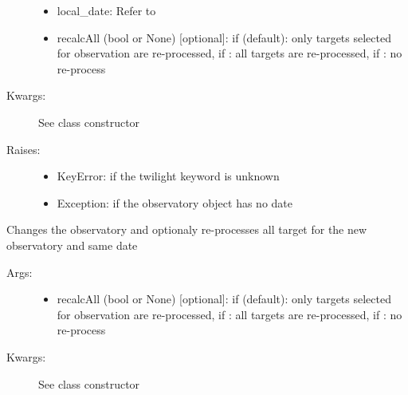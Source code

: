 \documentclass[letterpaper,10pt,english]{sphinxmanual}
\begin{document}
\begin{fulllineitems}
\begin{fulllineitems}
\begin{description}
\begin{itemize}
\item {} 
local\_date: Refer to 

\item {} 
recalcAll (bool or None) {[}optional{]}: if  (default): only targets selected for observation are re-processed, if : all targets are re-processed, if : no re-process

\end{itemize}

\item[{Kwargs:}] \leavevmode
See class constructor

\item[{Raises:}] \leavevmode\begin{itemize}
\item {} 
KeyError: if the twilight keyword is unknown

\item {} 
Exception: if the observatory object has no date

\end{itemize}

\end{description}

\end{fulllineitems}


\begin{fulllineitems}
\label{astroobs:astroobs.Observation.change_obs}
Changes the observatory and optionaly re-processes all target for the new observatory and same date
\begin{description}
\item[{Args:}] \leavevmode\begin{itemize}
\item {} 
recalcAll (bool or None) {[}optional{]}: if  (default): only targets selected for observation are re-processed, if : all targets are re-processed, if : no re-process

\end{itemize}

\item[{Kwargs:}] \leavevmode
See class constructor


\end{description}
\end{fulllineitems}
\end{fulllineitems}
\end{document}
